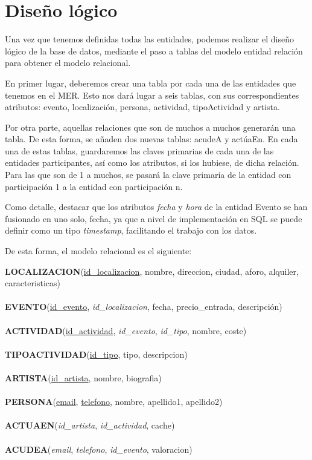 \documentclass[a4paper,onecolumn]{article}
\let\stdsection\section
\renewcommand\section{\newpage\stdsection}
\begin{document}
\begin{sloppypar}
\section{Diseño lógico} \label{mr}
Una vez que tenemos definidas todas las entidades, podemos realizar el diseño lógico de la base de datos, mediante el paso a tablas del modelo 
entidad relación para obtener el modelo relacional.

En primer lugar, deberemos crear una tabla por cada una de las entidades que tenemos en el MER. Esto nos dará lugar a seis tablas, con sus 
correspondientes atributos: evento, localización, persona, actividad, tipoActividad y artista.

Por otra parte, aquellas relaciones que son de muchos a muchos generarán una tabla. De esta forma, se añaden dos nuevas tablas: acudeA y actúaEn. 
En cada una de estas tablas, guardaremos las claves primarias de cada una de las entidades participantes, así como los atributos, si los hubiese,
de dicha relación. Para las que son de 1 a muchos, se pasará la clave primaria de la entidad con participación 1 a la entidad con participación n.

Como detalle, destacar que los atributos \textit{fecha} y \textit{hora} de la entidad Evento se han fusionado en uno solo, fecha, ya que a nivel 
de implementación en SQL se puede definir como un tipo \textit{timestamp}, facilitando el trabajo con los datos.

De esta forma, el modelo relacional es el siguiente:

\noindent
\textbf{LOCALIZACION}(\underline{id\_localizacion}, nombre, direccion, ciudad, aforo, alquiler, caracteristicas)\\ \\
\textbf{EVENTO}(\underline{id\_evento}, \textit{id\_localizacion}, fecha, precio\_entrada, descripción)\\ \\
\textbf{ACTIVIDAD}(\underline{id\_actividad}, \textit{id\_evento}, \textit{id\_tipo}, nombre, coste)\\ \\
\textbf{TIPOACTIVIDAD}(\underline{id\_tipo}, tipo, descripcion)\\ \\
\textbf{ARTISTA}(\underline{id\_artista}, nombre, biografia)\\ \\
\textbf{PERSONA}(\underline{email}, \underline{telefono}, nombre, apellido1, apellido2)\\ \\
\textbf{ACTUAEN}(\textit{id\_artista}, \textit{id\_actividad}, cache)\\ \\
\textbf{ACUDEA}(\textit{email}, \textit{telefono}, \textit{id\_evento}, valoracion)\\ \\



\end{sloppypar}
\end{document}
